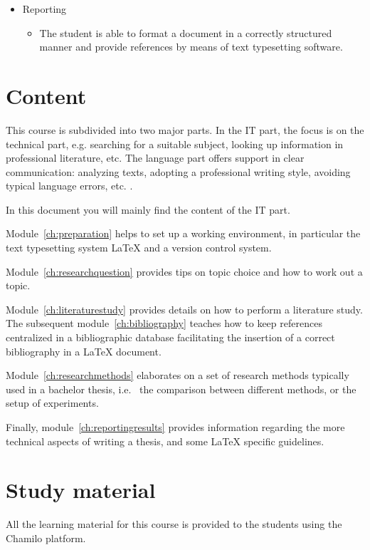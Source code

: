 \begin{itemize}
  \item Reporting
        \begin{itemize}        
           \item The student is able to format a document in a correctly structured manner and provide references by means of text typesetting software.
        \end{itemize}
\end{itemize}

\section{Content}
\label{sec:studycontent}
This course is subdivided into two major parts. In the IT part, the focus is on the technical part, e.g. searching for a suitable subject, looking up information in professional literature, etc. The language part offers support in clear communication: analyzing texts, adopting a professional writing style, avoiding typical language errors, etc. .

In this document you will mainly find the content of the IT part.

Module~\ref{ch:preparation} helps to set up a working environment, in particular the text typesetting system {\LaTeX} and a version control system.

Module~\ref{ch:researchquestion} provides tips on topic choice and how to work out a topic.

Module~\ref{ch:literaturestudy} provides details on how to perform a literature study. The subsequent module~\ref{ch:bibliography} teaches how to keep references centralized in a bibliographic database facilitating the insertion of a correct bibliography in a {\LaTeX} document.

Module~\ref{ch:researchmethods} elaborates on a set of research methods typically used in a bachelor thesis, i.e. \ the comparison between different methods, or the setup of experiments. 

Finally, module~\ref{ch:reportingresults} provides information regarding the more technical aspects of writing a thesis, and some {\LaTeX} specific guidelines.

\section{Study material}
\label{sec:studymaterial}

All the learning material for this course is provided to the students using the Chamilo platform. 

